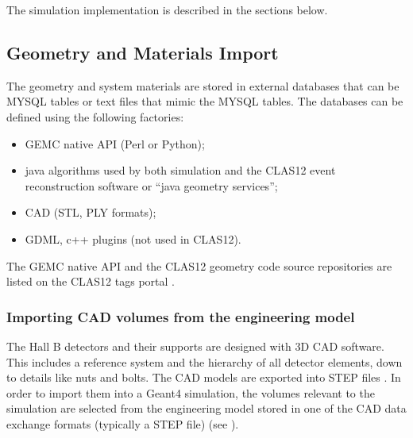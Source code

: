 The simulation implementation is described in the sections below.

\subsection{Geometry and Materials Import}

The geometry and system materials are stored in external databases that can be MYSQL tables or text files that mimic the MYSQL tables.
The databases can be defined using the following factories:

\begin{itemize}
	\item GEMC native API (Perl or Python);
	\item java algorithms used by both simulation and the CLAS12 event reconstruction software \cite{recon-nim} or ``java geometry services'';
	\item CAD (STL, PLY formats);
	\item GDML, c++ plugins (not used in CLAS12).
\end{itemize}

The GEMC native API and the CLAS12 geometry code source repositories are listed on the CLAS12 tags portal \cite{clas12Tags}.


\subsubsection{Importing CAD volumes from the engineering model}

The Hall B detectors and their supports are designed with 3D CAD software. This includes a reference system and the
hierarchy of all detector elements, down to details like nuts and bolts. The CAD models are exported into STEP files \cite{stepFiles}.
In order to import them into a Geant4 simulation, the volumes relevant to the simulation are selected from the engineering
model stored in one of the CAD data exchange formats (typically a STEP file) \cite{cadExchange} (see ).

